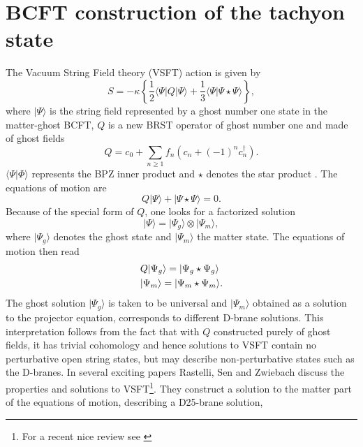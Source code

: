 \documentclass[a4paper,12pt]{article}
\begin{document}
\vspace*{.8cm}

\section{BCFT construction of the tachyon state}

The Vacuum String Field theory (VSFT) action is given by
\begin{equation}
S=-\kappa\left\{\frac 12\langle\Psi|Q|\Psi\rangle+\frac 13
\langle\Psi|\Psi\star\Psi\rangle\right\},
\label{1}
\end{equation}
where $|\Psi\rangle$ is the string field represented by a ghost number one
state in the matter-ghost BCFT, $Q$ is a new BRST operator of ghost number
one and made of ghost fields
\begin{equation}
Q=c_0+\sum\limits_{n\geq 1}f_n(c_n+(-1)^nc^\dagger_n).
\label{2}
\end{equation}
$\langle\Psi|\Phi\rangle$ represents the BPZ inner product and $\star$
denotes the star product \cite{w}.  The equations of motion are
\begin{equation}
Q|\Psi\rangle+|\Psi\star\Psi\rangle=0.
\label{3}
\end{equation}
Because of the special form of $Q$, one looks for a factorized solution
\begin{equation}
|\Psi\rangle=|\Psi_g\rangle\otimes|\Psi_m\rangle ,
\label{4}
\end{equation}
where $|\Psi_g\rangle$ denotes the ghost state and $|\Psi_m\rangle$ the
matter state. The equations of motion then read
\begin{align}
& Q|\Psi_g\rangle=|\Psi_g\star\Psi_g\rangle \notag \\
& |\Psi_m\rangle=|\Psi_m\star\Psi_m\rangle.
\label{5}
\end{align}
The ghost solution $|\Psi_g\rangle$ is taken to be universal and
$|\Psi_m\rangle$ obtained as a solution to the projector equation,
corresponds to different D-brane solutions. This interpretation follows from
the fact that with $Q$ constructed purely of ghost fields, it has trivial
cohomology and hence solutions to VSFT contain no perturbative open string
states, but may describe non-perturbative states such as the D-branes. In
several exciting papers \cite{rsz2,rsz3,rsz4} Rastelli, Sen and Zwiebach
discuss the properties and solutions to VSFT\footnote{For a recent nice review
see \cite{rsz5}}. They construct a solution to
the matter part of the equations of motion, describing a D25-brane solution,
\end{document}
